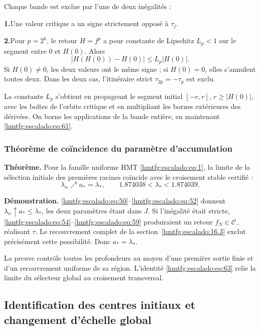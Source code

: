 Chaque bande est exclue par l’une de deux inégalités :

\par\noindent\textbf{1.}\enspace Une valeur critique a un signe strictement opposé à \(\tau_j\).
\par\noindent\textbf{2.}\enspace Pour \(p=2^k\), le retour \(H=f^p\) a pour constante de Lipschitz \(L_p<1\) sur le segment entre \(0\) et \(H(0)\). Alors
\[
|H(H(0))-H(0)|\le L_p|H(0)|.
\]
Si \(H(0)\ne0\), les deux valeurs ont le même signe ; si \(H(0)=0\), elles s’annulent toutes deux. Dans les deux cas, l’itinéraire strict \(\tau_{2p}=-\tau_p\) est exclu.

La constante \(L_p\) s’obtient en propageant le segment initial \([-r,r]\), \(r\ge|H(0)|\), avec les boîtes de l’orbite critique et en multipliant les bornes extérieures des dérivées. On borne les applications de la bande entière, en maintenant \eqref{hmtfg:escalado:eq:61}.

\subsubsection{Théorème de coïncidence du paramètre d’accumulation}
\label{hmtfg:escalado:16.4}

\textbf{Théorème.} Pour la famille uniforme HMT \eqref{hmtfg:escalado:eq:1}, la limite de la sélection initiale des premières racines coïncide avec le croisement stable certifié :
\begin{equation}
\boxed{\lambda_n\nearrow a_*=\lambda_*,
\qquad 1.874038<\lambda_*<1.874039.}
\label{hmtfg:escalado:eq:63}
\end{equation}

\textbf{Démonstration.} \eqref{hmtfg:escalado:eq:50}–\eqref{hmtfg:escalado:eq:52} donnent \(\lambda_n\uparrow a_*\le\lambda_*\), les deux paramètres étant dans \(J\). Si l’inégalité était stricte, \eqref{hmtfg:escalado:eq:54}–\eqref{hmtfg:escalado:eq:59} produiraient un retour \(f_N\in\mathcal C_-\) réalisant \(\tau\). Le recouvrement complet de la section~\ref{hmtfg:escalado:16.3} exclut précisément cette possibilité. Donc \(a_*=\lambda_*\).

La preuve contrôle toutes les profondeurs au moyen d’une première sortie finie et d’un recouvrement uniforme de sa région. L’identité \eqref{hmtfg:escalado:eq:63} relie la limite du sélecteur global au croisement transversal.


\subsection{Identification des centres initiaux et changement d’échelle global}
\label{hmtfg:escalado:17}

